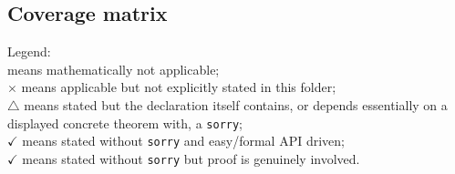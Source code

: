 \documentclass[UTF8,a4paper,11pt,fontset=fandol]{ctexart}
\theoremstyle{definition}
\newcommand{\gok}{\textcolor{green!55!black}{\ensuremath{\checkmark}}}
\newcommand{\yok}{\textcolor{yellow!45!black}{\ensuremath{\checkmark}}}
\newcommand{\warnsym}{\textcolor{orange!85!black}{\ensuremath{\triangle}}}
\newcommand{\bad}{\textcolor{red!70!black}{\ensuremath{\times}}}
\newcommand{\na}{\textemdash}
\begin{document}
\subsection{Coverage matrix}

Legend:\\
\na{} means mathematically not applicable;\\
\bad{} means applicable but not explicitly stated in this folder;\\
\warnsym{} means stated but the declaration itself contains, or depends essentially on a displayed concrete theorem with, a \verb|sorry|;\\
\gok{} means stated without \verb|sorry| and easy/formal API driven;\\
\yok{} means stated without \verb|sorry| but proof is genuinely involved.
\end{document}
